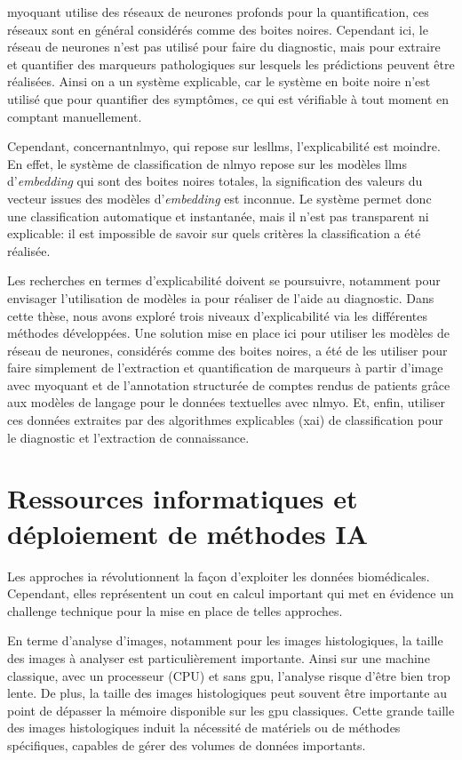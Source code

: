 \gls{myoquant} utilise des réseaux de neurones profonds pour la quantification, ces réseaux sont en général considérés comme des boites noires. Cependant ici, le réseau de neurones n'est pas utilisé pour faire du diagnostic, mais pour extraire et quantifier des marqueurs pathologiques sur lesquels les prédictions peuvent être réalisées. Ainsi on a un système explicable, car le système en boite noire n'est utilisé que pour quantifier des symptômes, ce qui est vérifiable à tout moment en comptant manuellement.

Cependant, concernant\gls{nlmyo}, qui repose sur les\gls{llms}, l'explicabilité est moindre. En effet, le système de classification de \gls{nlmyo} repose sur les modèles \gls{llms} d'\textit{embedding} qui sont des boites noires totales, la signification des valeurs du vecteur issues des modèles d'\textit{embedding} est inconnue. Le système permet donc une classification automatique et instantanée, mais il n'est pas transparent ni explicable: il est impossible de savoir sur quels critères la classification a été réalisée.

Les recherches en termes d'explicabilité doivent se poursuivre, notamment pour envisager l'utilisation de modèles \gls{ia} pour réaliser de l'aide au diagnostic. Dans cette thèse, nous avons exploré trois niveaux d'explicabilité via les différentes méthodes développées. Une solution mise en place ici pour utiliser les modèles de réseau de neurones, considérés comme des boites noires, a été de les utiliser pour faire simplement de l'extraction et quantification de marqueurs à partir d'image avec \gls{myoquant} et de l'annotation structurée de comptes rendus de patients grâce aux modèles de langage pour le données textuelles avec \gls{nlmyo}. Et, enfin, utiliser ces données extraites par des algorithmes explicables (\gls{xai}) de classification pour le diagnostic et l'extraction de connaissance.

\section{Ressources informatiques et déploiement de méthodes IA}
Les approches \gls{ia} révolutionnent la façon d'exploiter les données biomédicales. Cependant, elles représentent un cout en calcul important qui met en évidence un challenge technique pour la mise en place de telles approches.

En terme d'analyse d'images, notamment pour les images histologiques, la taille des images à analyser est particulièrement importante. Ainsi sur une machine classique, avec un processeur (CPU) et sans \gls{gpu}, l'analyse risque d'être bien trop lente. De plus, la taille des images histologiques peut souvent être importante au point de dépasser la mémoire disponible sur les \gls{gpu} classiques. Cette grande taille des images histologiques induit la nécessité de matériels ou de méthodes spécifiques, capables de gérer des volumes de données importants.

